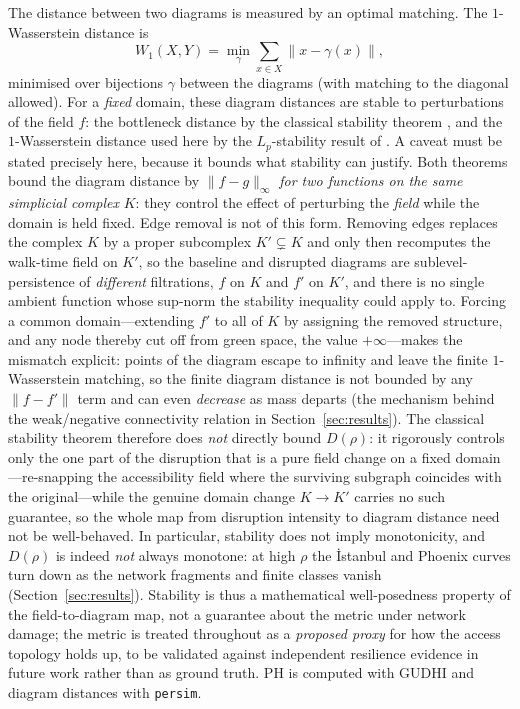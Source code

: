 \documentclass[sn-mathphys-num,pdflatex]{sn-jnl}
\newcommand{\Drho}{D(\rho)}
\begin{document}
The distance between two diagrams is measured by an optimal matching. The
$1$-Wasserstein distance is
\[
W_1(X,Y)=\min_{\gamma}\sum_{x\in X}\lVert x-\gamma(x)\rVert,
\]
minimised over bijections $\gamma$ between the diagrams (with matching to the
diagonal allowed). For a \emph{fixed} domain, these diagram distances are stable to
perturbations of the field $f$: the bottleneck distance by the classical stability
theorem \citep{cohensteiner2007stability}, and the $1$-Wasserstein distance used here
by the $L_p$-stability result of \citet{cohensteiner2010lpstable}. A caveat must be
stated precisely here, because it bounds what stability can justify. Both theorems
bound the diagram distance by $\lVert f-g\rVert_\infty$ \emph{for two functions on the
same simplicial complex} $K$: they control the effect of perturbing the \emph{field}
while the domain is held fixed. Edge removal is not of this form. Removing edges
replaces the complex $K$ by a proper subcomplex $K'\subsetneq K$ and only then
recomputes the walk-time field on $K'$, so the baseline and disrupted diagrams are
sublevel-persistence of \emph{different} filtrations, $f$ on $K$ and $f'$ on $K'$, and
there is no single ambient function whose sup-norm the stability inequality could
apply to. Forcing a common domain---extending $f'$ to all of $K$ by assigning the
removed structure, and any node thereby cut off from green space, the value
$+\infty$---makes the mismatch explicit: points of the diagram escape to infinity and
leave the finite $1$-Wasserstein matching, so the finite diagram distance is not
bounded by any $\lVert f-f'\rVert$ term and can even \emph{decrease} as mass departs
(the mechanism behind the weak/negative connectivity relation in
Section~\ref{sec:results}). The classical stability theorem therefore does
\emph{not} directly bound $\Drho$: it rigorously controls only the one part of the
disruption that is a pure field change on a fixed domain---re-snapping the
accessibility field where the surviving subgraph coincides with the original---while
the genuine domain change $K\to K'$ carries no such guarantee, so the whole map from
disruption intensity to diagram distance need not be well-behaved. In particular, stability does not imply
monotonicity, and $\Drho$ is indeed \emph{not} always monotone: at high $\rho$ the
İstanbul and Phoenix curves turn down as the network fragments and finite classes
vanish (Section~\ref{sec:results}). Stability is thus a mathematical well-posedness
property of the field-to-diagram map, not a guarantee about the metric under network
damage; the metric is treated throughout as a \emph{proposed proxy} for how the
access topology holds up, to be validated against independent resilience evidence in
future work rather than as ground truth. PH is computed with GUDHI \citep{gudhi} and diagram distances with
\texttt{persim}.
\end{document}
